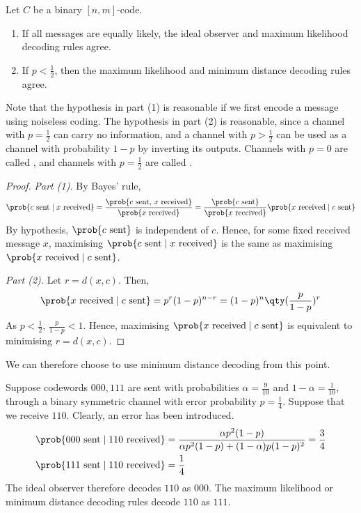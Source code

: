 \begin{lemma}
    Let $C$ be a binary $[n,m]$-code.
    \begin{enumerate}
        \item If all messages are equally likely, the ideal observer and maximum likelihood decoding rules agree.
        \item If $p < \frac{1}{2}$, then the maximum likelihood and minimum distance decoding rules agree.
    \end{enumerate}
\end{lemma}
Note that the hypothesis in part (1) is reasonable if we first encode a message using noiseless coding.
The hypothesis in part (2) is reasonable, since a channel with $p = \frac{1}{2}$ can carry no information, and a channel with $p > \frac{1}{2}$ can be used as a channel with probability $1 - p$ by inverting its outputs.
Channels with $p = 0$ are called , and channels with $p = \frac{1}{2}$ are called .
\begin{proof}
    \emph{Part (1).}
    By Bayes' rule,
    \begin{align*}
            \prob{c \text{ sent} \mid x \text{ received}} = \frac{\prob{c \text{ sent, } x \text{ received}}}{\prob{x \text{ received}}} = \frac{\prob{c \text{ sent}}}{\prob{x \text{ received}}} \prob{x \text{ received} \mid c \text{ sent}}
    \end{align*}
    By hypothesis, $\prob{c \text{ sent}}$ is independent of $c$.
    Hence, for some fixed received message $x$, maximising $\prob{c \text{ sent} \mid x \text{ received}}$ is the same as maximising $\prob{x \text{ received} \mid c \text{ sent}}$.

    \emph{Part (2).}
    Let $r = d(x,c)$.
    Then,
    \begin{align*}
        \prob{x \text{ received} \mid c \text{ sent}} = p^r (1-p)^{n-r} = (1-p)^n \qty(\frac{p}{1-p})^r
    \end{align*}
    As $p < \frac{1}{2}$, $\frac{p}{1-p} < 1$.
    Hence, maximising $\prob{x \text{ received} \mid c \text{ sent}}$ is equivalent to minimising $r = d(x,c)$.
\end{proof}

We can therefore choose to use minimum distance decoding from this point.

\begin{example}
    Suppose codewords $000, 111$ are sent with probabilities $\alpha = \frac{9}{10}$ and $1 - \alpha = \frac{1}{10}$, through a binary symmetric channel with error probability $p = \frac{1}{4}$.
    Suppose that we receive $110$.
    Clearly, an error has been introduced.
    \begin{align*}
        \prob{000 \text{ sent} \mid 110 \text{ received}} &= \frac{\alpha p^2 (1-p)}{\alpha p^2 (1-p) + (1-\alpha)p(1-p)^2} = \frac{3}{4} \\
        \prob{111 \text{ sent} \mid 110 \text{ received}} &= \frac{1}{4}
    \end{align*}
    The ideal observer therefore decodes $110$ as $000$.
    The maximum likelihood or minimum distance decoding rules decode $110$ as $111$.
\end{example}

